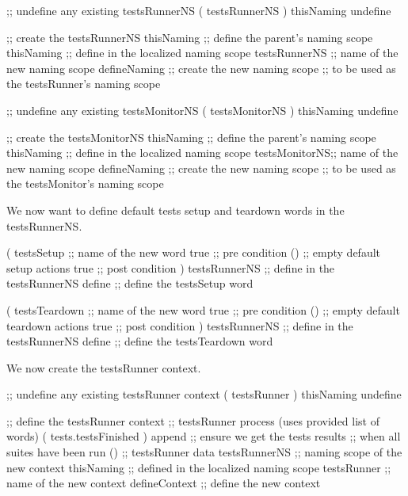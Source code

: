 \startJoylolCode
    ;; undefine any existing testsRunnerNS
    ( testsRunnerNS )
    thisNaming
    undefine
  
    ;; create the testsRunnerNS
    thisNaming    ;; define the parent's naming scope
    thisNaming    ;; define in the localized naming scope
    testsRunnerNS ;; name of the new naming scope
    defineNaming  ;; create the new naming scope
                  ;; to be used as the testsRunner's naming scope
\stopJoylolCode

\startJoylolCode
    ;; undefine any existing testsMonitorNS
    ( testsMonitorNS )
    thisNaming
    undefine
  
    ;; create the testsMonitorNS
    thisNaming    ;; define the parent's naming scope
    thisNaming    ;; define in the localized naming scope
    testsMonitorNS;; name of the new naming scope
    defineNaming  ;; create the new naming scope
                  ;; to be used as the testsMonitor's naming scope
\stopJoylolCode

We now want to define default tests setup and teardown words in the 
testsRunnerNS. 

\startJoylolCode
    (
      testsSetup  ;; name of the new word
      { true }    ;; pre condition
      ()          ;; empty default setup actions
      { true }    ;; post condition
    ) 
    testsRunnerNS ;; define in the testsRunnerNS
    define        ;; define the testsSetup word
\stopJoylolCode

\startJoylolCode
    (
      testsTeardown ;; name of the new word
      { true }    ;; pre condition
      ()          ;; empty default teardown actions
      { true }    ;; post condition
    ) 
    testsRunnerNS ;; define in the testsRunnerNS
    define        ;; define the testsTeardown word
\stopJoylolCode

We now create the testsRunner context.

\startJoylolCode
    ;; undefine any existing testsRunner context
    ( testsRunner )
    thisNaming
    undefine

    ;; define the testsRunner context
                  ;; testsRunner process (uses provided list of words)
    ( tests.testsFinished )
    append        ;; ensure we get the tests results
                  ;; when all suites have been run
    ()            ;; testsRunner data
    testsRunnerNS ;; naming scope of the new context
    thisNaming    ;; defined in the localized naming scope
    testsRunner   ;; name of the new context
    defineContext ;; define the new context
\stopJoylolCode

